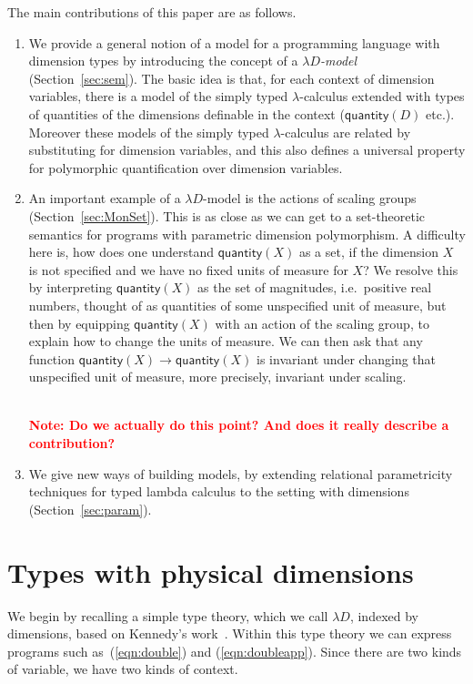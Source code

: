 \documentclass[a4paper,UKenglish]{lipics}
\newcommand\note[1]{{ \bf \textcolor{red} {\vspace{2mm}\; \\ Note: #1\\}}}
\newcommand{\msf}[1]{\mathsf{#1}} %
\newcommand{\qnt}{\msf{quantity}}
\newcommand{\Dvar}{X}
\begin{document}
The main contributions of this paper are as follows.
\begin{enumerate}
\item We provide a general notion of a model for a programming language with dimension types by introducing the concept of a \emph{$\lambda D$-model} (Section~\ref{sec:sem}). The basic idea is that, for each context of dimension variables, there is a model of the simply typed $\lambda$-calculus extended with types of quantities of the dimensions definable in the context ($\qnt(D)$ etc.). Moreover these models of the simply typed $\lambda$-calculus are related by substituting for dimension variables, and this also defines a universal property for polymorphic quantification over dimension variables.

\item An important example of a $\lambda D$-model is the actions of scaling groups (Section~\ref{sec:MonSet}). This is as close as we can get to a set-theoretic semantics for programs with parametric dimension polymorphism. A difficulty here is, how does one understand $\qnt(\Dvar)$ as a set, if the dimension $\Dvar$ is not specified and we have no fixed units of measure for $\Dvar$? We resolve this by interpreting $\qnt(\Dvar)$ as the set of magnitudes, i.e.~positive real numbers, thought of as quantities of some unspecified unit of measure, but then by equipping $\qnt(\Dvar)$ with an action of the scaling group, to explain how to change the units of measure. We can then ask that any function $\qnt(\Dvar)\to\qnt(\Dvar)$ is invariant under changing that unspecified unit of measure, more precisely, invariant under scaling.

\note{Do we actually do this point? And does it really describe a contribution?}

\item We give new ways of building models, by extending relational parametricity techniques for typed lambda calculus to the setting with dimensions (Section~\ref{sec:param}).
\end{enumerate}


\section{Types with physical dimensions}
\label{sec:Not}
We begin by recalling a simple type theory, which we call $\lambda D$, indexed by dimensions, based on Kennedy's work~\cite{Kennedy:1997:RPU:263699.263761}. Within this type theory we can express programs such as~(\ref{eqn:double}) and (\ref{eqn:doubleapp}). Since there are two kinds of variable, we have two kinds of context.
\end{document}
